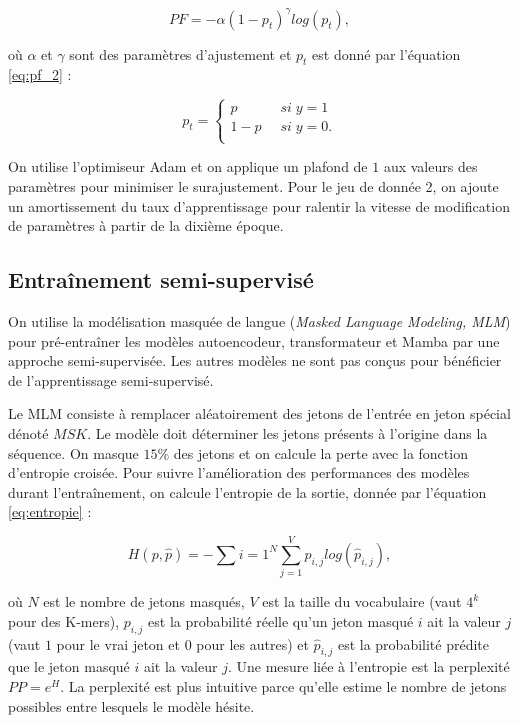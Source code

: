 \begin{equation}
    PF = -\alpha (1 - p_t)^\gamma log(p_t),
    \label{eq:perte_focale}
\end{equation}

où $\alpha$ et $\gamma$ sont des paramètres d'ajustement et $p_t$ est donné par l'équation
\ref{eq:pf_2} :

\begin{equation}
    p_t =
    \begin{cases}
        p \;\; &si \; y = 1 \\
        1 - p \;\; &si \; y = 0. \\
    \end{cases}
    \label{eq:pf_2}
\end{equation}

On utilise l'optimiseur Adam \cite{adam2017} et on applique un plafond de $1$ aux valeurs des
paramètres pour minimiser le surajustement. Pour le jeu de donnée 2, on ajoute un amortissement du
taux d'apprentissage pour ralentir la vitesse de modification de paramètres à partir de la dixième
époque.

\subsection{Entraînement semi-supervisé}
On utilise la modélisation masquée de langue (\textit{Masked Language Modeling, MLM}) pour
pré-entraîner les modèles autoencodeur, transformateur et Mamba par une approche semi-supervisée.
Les autres modèles ne sont pas conçus pour bénéficier de l'apprentissage semi-supervisé.

Le MLM consiste à remplacer aléatoirement des jetons de l'entrée en jeton spécial dénoté $MSK$. Le
modèle doit déterminer les jetons présents à l'origine dans la séquence. On masque $15\%$ des jetons
et on calcule la perte avec la fonction d'entropie croisée. Pour suivre l'amélioration des
performances des modèles durant l'entraînement, on calcule l'entropie de la sortie, donnée par
l'équation \ref{eq:entropie} :

\begin{equation}
    H(p, \hat{p}) = - \sum{i=1}^N \sum_{j=1}^V p_{i, j} log(\hat{p}_{i, j}),
    \label{eq:entropie}
\end{equation}

où $N$ est le nombre de jetons masqués, $V$ est la taille du vocabulaire (vaut $4^k$ pour des
K-mers), $p_{i, j}$ est la probabilité réelle qu'un jeton masqué $i$ ait la valeur $j$ (vaut $1$
pour le vrai jeton et $0$ pour les autres) et $\hat{p}_{i, j}$ est la probabilité prédite que le
jeton masqué $i$ ait la valeur $j$. Une mesure liée à l'entropie est la perplexité $PP = e^H$. La
perplexité est plus intuitive parce qu'elle estime le nombre de jetons possibles entre lesquels le
modèle hésite.

